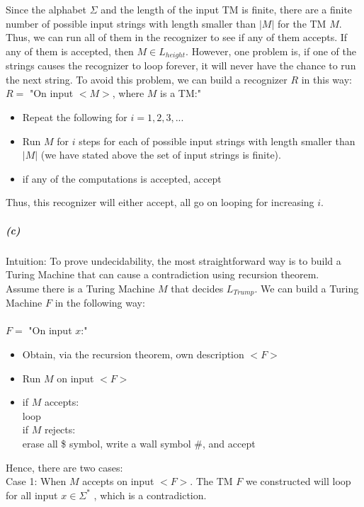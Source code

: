 \documentclass[11pt]{article}
\newcommand\tab[1][1cm]{\hspace*{#1}}
\begin{document}
Since the alphabet $\Sigma$ and the length of the input TM is finite, there are a finite number of possible input strings with length smaller than $|M|$ for the TM $M$. Thus, we can run all of them in the recognizer to see if any of them accepts. If any of them is accepted, then $M \in L_{height}$. However, one problem is, if one of the strings causes the recognizer to loop forever, it will never have the chance to run the next string. To avoid this problem, we can build a recognizer $R$ in this way: \\

$R=$ "On input $<M>$, where $M$ is a TM:"
\begin{itemize}
\item Repeat the following for $i = 1,2,3,...$
\item  Run $M$ for $i$ steps for each of possible input strings with length smaller than $|M|$ (we have stated above the set of  input strings is finite).
\item if any of the computations is accepted, accept 
\end{itemize}

Thus, this recognizer will either accept, all go on looping for increasing $i$.

\subparagraph{(c)}
Intuition: To prove undecidability, the most straightforward way is to build a Turing Machine that can cause a contradiction using recursion theorem. \\

Assume there is a Turing Machine $M$ that decides $L_{Trump}$. We can build a Turing Machine $F$ in the following way: \\~\\

$F=$ "On input $x$:"
\begin{itemize}
\item Obtain, via the recursion theorem, own description $<F>$ 
\item  Run $M$ on input $<F>$ 
\item if $M$ accepts: \\
\tab loop \\
if $M$ rejects: \\
\tab erase all \$ symbol, write a wall symbol \#, and accept
\end{itemize}

Hence, there are two cases: \\

Case 1: When $M$ accepts on input $<F>$. The TM $F$ we constructed will loop for all input $x \in \Sigma^*$ , which is a contradiction. \\
\end{document}
